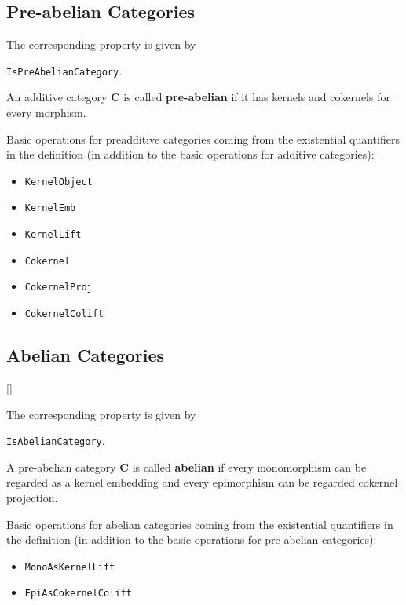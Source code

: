 \subsection{Pre-abelian Categories}

\begin{documentation}
 The corresponding \GAP property is given by
 \begin{center}
  \texttt{IsPreAbelianCategory}.  
 \end{center}
\end{documentation}

\begin{definition}
 An additive category $\mathbf{C}$ is called \textbf{pre-abelian} 
 if it has kernels and cokernels for every morphism.
\end{definition}

Basic operations for preadditive categories coming from the existential quantifiers
in the definition
(in addition to the basic operations for additive categories):
\begin{itemize}
 \item \texttt{KernelObject}
 \item \texttt{KernelEmb}
 \item \texttt{KernelLift}
 \item \texttt{Cokernel}
 \item \texttt{CokernelProj}
 \item \texttt{CokernelColift}
\end{itemize}


\subsection{Abelian Categories}[\cite{MLCWM}]

\begin{documentation}
 The corresponding \GAP property is given by
 \begin{center}
  \texttt{IsAbelianCategory}.  
 \end{center}
\end{documentation}

\begin{definition}
 A pre-abelian category $\mathbf{C}$ is called \textbf{abelian}
 if every monomorphism can be regarded as a kernel embedding
 and every epimorphism can be regarded cokernel projection.
\end{definition}

Basic operations for abelian categories coming from the existential quantifiers
in the definition
(in addition to the basic operations for pre-abelian categories):
\begin{itemize}
 \item \texttt{MonoAsKernelLift}
 \item \texttt{EpiAsCokernelColift}
\end{itemize}

